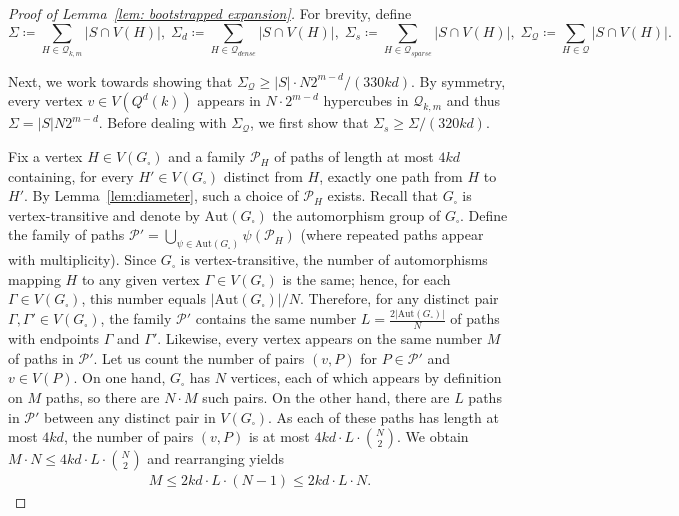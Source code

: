 \documentclass[10pt,a4paper]{amsart}
\newcommand{\cP}{\mathcal{P}}
\newcommand{\cQ}{\mathcal{Q}}
\begin{document}
\begin{proof}[Proof of Lemma~\ref{lem: bootstrapped expansion}]
For brevity, define 
\[\Sigma\coloneqq\sum_{H\in \cQ_{k,m}}|S\cap V(H)|,\; \Sigma_d\coloneqq\sum_{H\in \cQ_{dense}}|S\cap V(H)|,\; \Sigma_s\coloneqq\sum_{H\in \cQ_{sparse}}|S\cap V(H)|,\; \Sigma_{\cQ}\coloneqq\sum_{H\in \cQ}|S\cap V(H)|.\]

Next, we work towards showing that $\Sigma_{\cQ}\ge |S|\cdot N2^{m-d}/(330kd)$. By symmetry, every vertex $v\in V(Q^d(k))$ appears in $N\cdot 2^{m-d}$ hypercubes in $\cQ_{k,m}$ and thus $\Sigma= |S|N2^{m-d}$. Before dealing with $\Sigma_\cQ$, we first show that $\Sigma_s\geq \Sigma/(320kd)$. 

Fix a vertex $H\in V(G_{\square})$ and a family $\cP_H$ of paths of length at most $4kd$ containing, for every $H'\in V(G_{\square})$ distinct from $H$, exactly one path from $H$ to $H'$. 
By Lemma~\ref{lem:diameter}, such a choice of $\cP_H$ exists. Recall that $G_\square$ is vertex-transitive and denote by $\mathrm{Aut}(G_{\square})$ the automorphism group of $G_{\square}$. 
Define the family of paths $\cP'=\bigcup_{\psi\in\mathrm{Aut}(G_{\square})}\psi(\cP_H)$ (where repeated paths appear with multiplicity). Since $G_{\square}$ is vertex-transitive, the number of automorphisms mapping $H$ to any given vertex $\Gamma\in V(G_{\square})$ is the same; hence, for each $\Gamma\in V(G_{\square})$, this number equals $|\mathrm{Aut}(G_{\square})|/N$. Therefore, for any distinct pair $\Gamma,\Gamma'\in V(G_{\square})$, the family $\cP'$ contains the same number $L=\frac{2|\mathrm{Aut}(G_{\square})|}{N}$ of paths with endpoints $\Gamma$ and $\Gamma'$. Likewise, every vertex appears on the same number $M$ of paths in $\cP'$. Let us count the number of pairs $(v,P)$ for $P\in \cP'$ and $v\in V(P)$.
On one hand, $G_\square$ has $N$ vertices, each of which appears by definition on $M$ paths, so there are $N\cdot M$ such pairs. 
On the other hand, there are $L$ paths in $\cP'$ between any distinct pair in $V(G_\square)$. As each of these paths has length at most $4kd$, the number of pairs $(v,P)$ is at most $4kd\cdot L\cdot \binom{N}{2}$. We obtain $M\cdot N\leq 4kd \cdot L\cdot \binom{N}{2}$ and rearranging yields 
\begin{align}\label{eq: path double count}
    M\leq 2kd\cdot L\cdot (N-1)\leq 2kd\cdot L\cdot N.
\end{align}


\end{proof}
\end{document}

